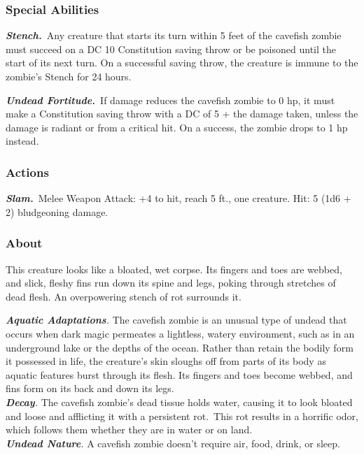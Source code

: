 \documentclass[10pt,twocolumn]{article}
\let\oldtextbf\textbf
\renewcommand{\textbf}[1]{\oldtextbf{{#1}}}
\begin{document}
\subsubsection{Special Abilities}\label{special-abilities-2}

\textbf{\emph{Stench.}}~Any creature that starts its turn within 5 feet
of the cavefish zombie must succeed on a DC 10 Constitution saving throw
or be poisoned until the start of its next turn. On a successful saving
throw, the creature is immune to the zombie's Stench for 24 hours.

\textbf{\emph{Undead Fortitude.}}~If damage reduces the cavefish zombie
to 0 hp, it must make a Constitution saving throw with a DC of 5 + the
damage taken, unless the damage is radiant or from a critical hit. On a
success, the zombie drops to 1 hp instead.

\subsubsection{Actions}\label{actions-9}

\textbf{\emph{Slam.}}~Melee Weapon Attack: +4 to hit, reach 5 ft., one
creature. Hit: 5 (1d6 + 2) bludgeoning damage.

\subsubsection{About}\label{about}

This creature looks like a bloated, wet corpse. Its fingers and toes are
webbed, and slick, fleshy fins run down its spine and legs, poking
through stretches of dead flesh. An overpowering stench of rot surrounds
it.

\emph{\textbf{Aquatic Adaptations}.} The cavefish zombie is an unusual
type of undead that occurs when dark magic permeates a lightless, watery
environment, such as in an underground lake or the depths of the ocean.
Rather than retain the bodily form it possessed in life, the creature's
skin sloughs off from parts of its body as aquatic features burst
through its flesh. Its fingers and toes become webbed, and fins form on
its back and down its legs.\\
\emph{\textbf{Decay}.} The cavefish zombie's dead tissue holds water,
causing it to look bloated and loose and afflicting it with a persistent
rot.~This rot results in a horrific odor, which follows them whether
they are in water or on land.\\
\emph{\textbf{Undead Nature}.} A cavefish zombie doesn't require air,
food, drink, or sleep.

\endgroup
\end{document}
